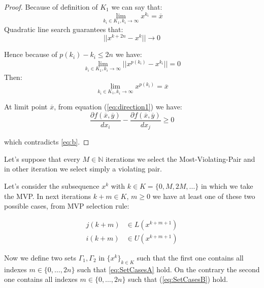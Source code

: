 \begin{proof}
Because of  definition of $K_1$ we can say that:
\begin{equation}
 \lim_{k_i \in K_1, k_i \rightarrow \infty} x^{k_i} =\overline{x}
\end{equation}
Quadratic line search guarantees that:
\begin{equation}
 ||x^{k+2n}-x^{k}|| \rightarrow 0
\end{equation}


Hence because of $p(k_i)-k_i \le 2n$ we have:
\begin{equation}
 \lim_{k_i \in K_1,k_i\rightarrow \infty}  ||x^{p(k_i)}-x^{k_i}||=0
\end{equation}
Then:
\begin{equation}
 \lim_{k_i \in K_1,k_i\rightarrow \infty} x^{p(k_i)}=\overline{x}
\end{equation}




At limit point $\overline{x}$, from equation (\ref{eq:direction1})  we have: 
\begin{equation*}
 \frac{\partial f(\overline{x},\overline{y})}{dx_i} - \frac{\partial f(\overline{x},\overline{y})}{dx_{j}} \ge 0
\end{equation*}




which contradicts \ref{eq:b}.

\end{proof}
\fi
 Let's suppose that every $M \in \mathbb{N}$ iterations we select the Most-Violating-Pair and in other iteration we select simply a violating pair.
 
 Let's consider the subsequence $x^{k}$ with $k  \in K =\{0,M,2M,\ldots\}$ in which we take the MVP.
 In next iterations $k+m \in K$, $m\ge 0$ we have at least one of these two possible cases, from MVP selection rule:

 
 \begin{subequations}
\begin{align}
 j(k+m) &\in L(x^{k+m+1})\label{eq:SetCasesA}\\
 i(k+m) &\in U(x^{k+m+1})\label{eq:SetCasesB}
\end{align}
\end{subequations}
 
 
 
Now we define two sets $\Gamma_1,\Gamma_2$ in $\{x^{k}\}_{k \in K}$ such that the first one contains all indexes $m \in\{0,\ldots,2n\}$ such that \ref{eq:SetCasesA} hold.
On the contrary the second one contains all indexes $m \in\{0,\ldots,2n\}$ such that (\ref{eq:SetCasesB}) hold.

